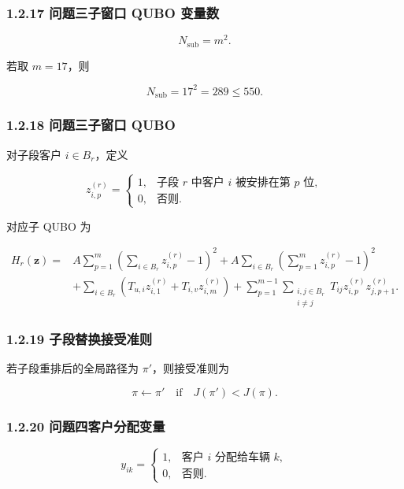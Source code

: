 \documentclass[
  a4paper,
]{ctexart}
\begin{document}
\subsubsection{1.2.17 问题三子窗口 QUBO
变量数}\label{ux95eeux9898ux4e09ux5b50ux7a97ux53e3-qubo-ux53d8ux91cfux6570}

\[
N_{\mathrm{sub}}=m^2.
\]

若取 \(m=17\)，则

\[
N_{\mathrm{sub}}=17^2=289\le 550.
\]

\subsubsection{1.2.18 问题三子窗口
QUBO}\label{ux95eeux9898ux4e09ux5b50ux7a97ux53e3-qubo}

对子段客户 \(i\in B_r\)，定义

\[
z_{i,p}^{(r)}=\begin{cases}
1, & \text{子段 }r\text{ 中客户 }i\text{ 被安排在第 }p\text{ 位},\\
0, & \text{否则}.
\end{cases}
\]

对应子 QUBO 为

\[
\begin{aligned}
H_r(\mathbf{z})=&
A\sum_{p=1}^{m}\left(\sum_{i\in B_r}z_{i,p}^{(r)}-1\right)^2
+A\sum_{i\in B_r}\left(\sum_{p=1}^{m}z_{i,p}^{(r)}-1\right)^2 \\
&+\sum_{i\in B_r}\left(T_{u,i}z_{i,1}^{(r)}+T_{i,v}z_{i,m}^{(r)}\right)
+\sum_{p=1}^{m-1}\sum_{\substack{i,j\in B_r\\ i\ne j}}T_{ij}z_{i,p}^{(r)}z_{j,p+1}^{(r)}.
\end{aligned}
\]

\subsubsection{1.2.19
子段替换接受准则}\label{ux5b50ux6bb5ux66ffux6362ux63a5ux53d7ux51c6ux5219}

若子段重排后的全局路径为 \(\pi'\)，则接受准则为

\[
\pi\leftarrow\pi'\quad \text{if}\quad J(\pi')<J(\pi).
\]

\subsubsection{1.2.20
问题四客户分配变量}\label{ux95eeux9898ux56dbux5ba2ux6237ux5206ux914dux53d8ux91cf}

\[
y_{ik}=\begin{cases}
1, & \text{客户 }i\text{ 分配给车辆 }k,\\
0, & \text{否则}.
\end{cases}
\]
\end{document}
